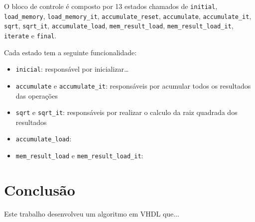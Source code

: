 \documentclass[12pt]{article}
\begin{document}
O bloco de controle é composto por 13 estados chamados de \verb|initial|,
\verb|load_memory|, \verb|load_memory_it|, \verb|accumulate_reset|,
\verb|accumulate|, \verb|accumulate_it|, \verb|sqrt|, \verb|sqrt_it|,
\verb|accumulate_load|, \verb|mem_result_load|, \verb|mem_result_load_it|,
\verb|iterate| e \verb|final|.

Cada estado tem a seguinte funcionalidade:

\begin{itemize}

\item \verb|inicial|: responsável por inicializar…
\item \verb|accumulate| e \verb|accumulate_it|: responsáveis por acumular todos
os resultados das operações
\item \verb|sqrt| e \verb|sqrt_it|: responsáveis por realizar o calculo da raiz
quadrada dos resultados
\item \verb|accumulate_load|:
\item \verb|mem_result_load| e \verb|mem_result_load_it|:

\end{itemize}


\section{Conclus\~ao}\label{sec:figs}

Este trabalho desenvolveu um algoritmo em VHDL que...









\end{document}
